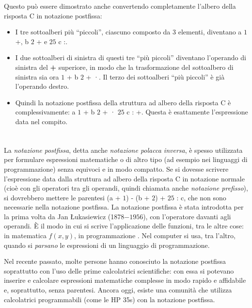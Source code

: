 {{Questo può essere dimostrato anche convertendo completamente l’albero della risposta C in notazione postfissa:

\begin{itemize}
  \item I tre sottoalberi più \enquote{piccoli}, ciascuno composto da $3$ elementi, diventano a $1$ +, b $2$ + e $25$ c :.
  \item I due sottoalberi di sinistra di questi tre \enquote{più piccoli} diventano l’operando di sinistra del \textbf{+} superiore, in modo che la trasformazione del sottoalbero di sinistra sia ora $1$ + b $2$ + ·. Il terzo dei sottoalberi \enquote{più piccoli} è già l’operando destro.
  \item Quindi la notazione postfissa della struttura ad albero della risposta C è complessivamente: a $1$ + b $2$ + · $25$ c : +. Questa è esattamente l’espressione data nel compito.
\end{itemize}



\section*{\BrochureItsInformatics}
La \emph{notazione postfissa}, detta anche \emph{notazione polacca inversa}, è spesso utilizzata per formulare espressioni matematiche o di altro tipo (ad esempio nei linguaggi di programmazione) senza equivoci e in modo compatto. Se si dovesse scrivere l’espressione data dalla struttura ad albero della risposta C in notazione normale (cioè con gli operatori tra gli operandi, quindi chiamata anche \emph{notazione prefisso}), si dovrebbero mettere le parentesi (a + $1$) - (b + $2$) + $25$ : c, che non sono necessarie nella notazione postfissa. La notazione postfissa è stata introdotta per la prima volta da Jan Łukasiewicz (1878$-1956$), con l’operatore davanti agli operandi. È il modo in cui si scrive l’applicazione delle funzioni, tra le altre cose: in matematica ${f(x, y)}$, in programmazione .  Nel computer si usa, tra l’altro, quando si \emph{parsano} le espressioni di un linguaggio di programmazione.

Nel recente passato, molte persone hanno conosciuto la notazione postfissa soprattutto con l’uso delle prime calcolatrici scientifiche: con essa si potevano inserire e calcolare espressioni matematiche complesse in modo rapido e affidabile e, soprattutto, senza parentesi.  Ancora oggi, esiste una comunità che utilizza calcolatrici programmabili (come le HP 35s) con la notazione postfissa.



}}
